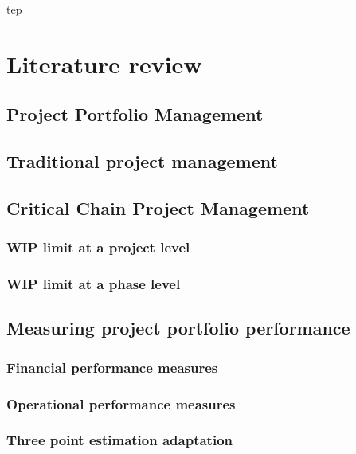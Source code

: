 \documentclass[a4paper,11pt,fleqn]{report}
\begin{document}
tep\chapter{Literature review}



\section{Project Portfolio Management}



\section{Traditional project management}



\section{Critical Chain Project Management}



\subsection{WIP limit at a project level}



\subsection{WIP limit at a phase level}



\section{Measuring project portfolio performance}



\subsection{Financial performance measures}



\subsection{Operational performance measures}



\subsection{Three point estimation adaptation}
\end{document}
